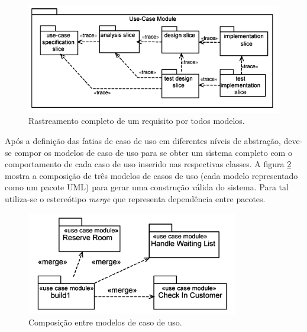 \begin{figure}
	\centering
	\includegraphics[width=450px]{img/jacobson_use_case_modules.png}
	\caption{Rastreamento completo
	de um requisito por todos
	modelos.}\label{fig:jacobson_use_case_modules}
\end{figure}

Após a definição das fatias de caso de uso em diferentes níveis de abstração, deve-se compor os modelos de caso de uso para se obter um sistema
completo com o comportamento de cada caso de uso inserido nas respectivas classes. A figura \ref{fig:jacobson_use_case_merge} mostra a composição de
três modelos de casos de uso (cada modelo representado como um pacote UML) para gerar uma construção válida do sistema. Para tal utiliza-se o
estereótipo \textit{merge} que representa dependência entre pacotes.

\begin{figure}
	\centering
	\includegraphics[width=350px]{img/jacobson_use_case_merge.png}
	\caption{Composição entre modelos de caso
	de uso.}\label{fig:jacobson_use_case_merge}
\end{figure}


